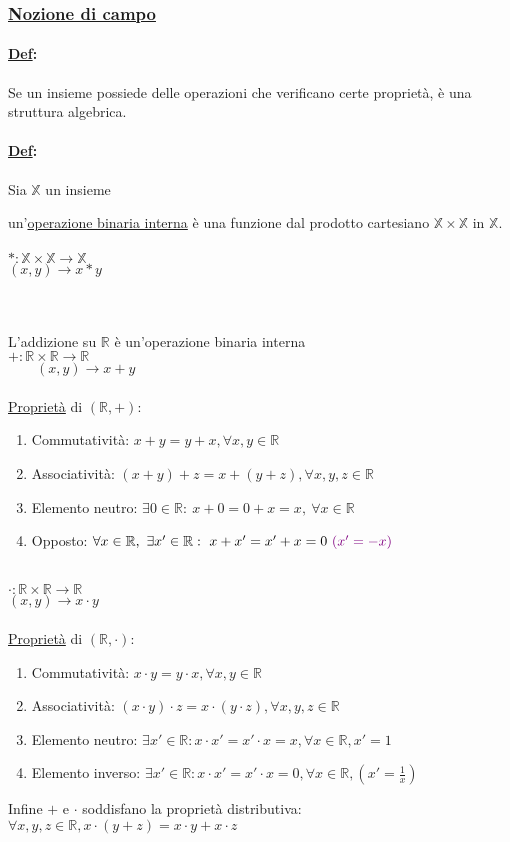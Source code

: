 \documentclass{article}
\newcommand{\ul}[1]{\underline{#1}}
\newcommand{\R}{\mathbb{R}}
\newcommand{\X}{\mathbb{X}}
\newcommand{\Def}[2]{\paragraph{\ul{Def}:}#1\\\hspace*{3em}\begin{minipage}{.8\textwidth}#2\end{minipage}}
\begin{document}
\subsubsection{\color{blue}\ul{Nozione di campo}}
\Def{Se un insieme possiede delle operazioni che verificano certe proprietà, è una struttura algebrica.}{}
\Def{Sia $\X$ un insieme}{un'\ul{operazione binaria interna} è una funzione dal prodotto cartesiano $\X\times \X$ in $\X$.\\\\$*:\X\times\X\rightarrow\X$\\\hspace*{1.4em}$(x,y)\rightarrow x*y$}\\\vspace{1em}\\
L'addizione su $\R$ è un'operazione binaria interna\\$+:\R\times\R\rightarrow\R$\\\hspace*{-0.7em}$\qquad(x,y)\rightarrow x+y$\\\\
\ul{Proprietà} di $(\R,+)$:
\begin{enumerate}
	\item Commutatività: $x+y=y+x,\forall x,y\in\R$
	\item Associatività: $(x+y)+z=x+(y+z),\forall x,y,z\in\R$
	\item Elemento neutro: $\exists0\in\R:\ x+0=0+x=x,\ \forall x\in\R$
	\item Opposto: $\forall x\in\R,\ \exists x'\in\R:\ x+x'=x'+x=0\ \color{violet}(x'=-x)$
\end{enumerate}\\
$\cdot:\R\times\R\rightarrow\R$\\
\hspace*{1.5em}$(x,y)\rightarrow x\cdot y$\\\\
\ul{Proprietà} di $(\R,\cdot)$:
\begin{enumerate}
	\item Commutatività: $x\cdot y=y\cdot x,\forall x,y\in\R$
	\item Associatività: $(x\cdot y)\cdot z=x\cdot(y\cdot z),\forall x,y,z\in\R$
	\item Elemento neutro: $\exists x'\in\R:x\cdot x'=x'\cdot x=x,\forall x\in\R,x'=1$
	\item Elemento inverso: $\exists x'\in\R:x\cdot x'=x'\cdot x=0,\forall x\in\R,(x'=\frac{1}{x})$
\end{enumerate}
Infine $+$ e $\cdot$ soddisfano la proprietà distributiva: $\forall x,y,z\in\R,x\cdot(y+z)=x\cdot y+x\cdot z$
\end{document}

